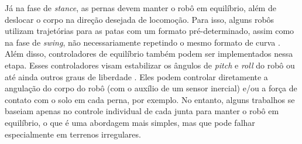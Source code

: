 \documentclass[../main.tex]{subfiles}
\begin{document}
Já na fase de \textit{stance}, as pernas devem manter o robô em equilíbrio, além de deslocar o corpo na direção desejada de locomoção. Para isso, alguns robôs utilizam trajetórias para as patas com um formato pré-determinado, assim como na fase de \textit{swing}, não necessariamente repetindo o mesmo formato de curva \cite{X.118, X.58}. Além disso, controladores de equilíbrio também podem ser implementados nessa etapa. Esses controladores visam estabilizar os ângulos de \textit{pitch} e \textit{roll} do robô \cite{Shi2021, StanfordPupper, HackadayQuadruped, Notspot} ou até ainda outros graus de liberdade \cite{X.134, Chen2020140736, Zhang2016284}. Eles podem controlar diretamente a angulação do corpo do robô (com o auxílio de um sensor inercial) e/ou a força de contato com o solo em cada perna, por exemplo. No entanto, alguns trabalhos se baseiam apenas no controle individual de cada junta para manter o robô em equilíbrio, o que é uma abordagem mais simples, mas que pode falhar especialmente em terrenos irregulares.
\end{document}
